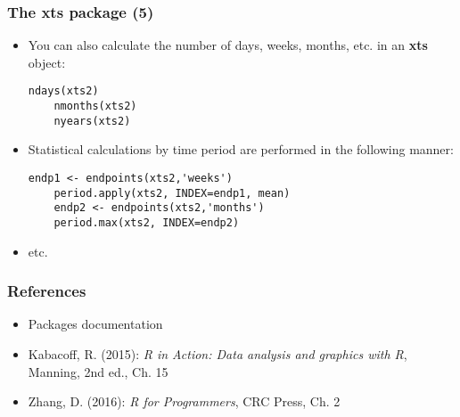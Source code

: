 \documentclass[10pt]{beamer}
\theoremstyle{definition}
\begin{document}
\begin{frame}[fragile]
\frametitle{The \textbf{xts} package (5)}
\begin{itemize}
	\item You can also calculate the number of days, weeks, months, etc. in an \textbf{xts} object:
	\begin{lstlisting}[style = rstyle, breaklines]
	ndays(xts2)
	nmonths(xts2)
	nyears(xts2)
	\end{lstlisting}
	\item Statistical calculations by time period are performed in the following manner:
	\begin{lstlisting}[style = rstyle, breaklines]
	endp1 <- endpoints(xts2,'weeks')
	period.apply(xts2, INDEX=endp1, mean)
	endp2 <- endpoints(xts2,'months')
	period.max(xts2, INDEX=endp2)
	\end{lstlisting}
	\item etc.
\end{itemize}
\end{frame}

\begin{frame}[fragile]
\frametitle{References}
\begin{itemize}
	\item Packages documentation
	\item Kabacoff, R. (2015): \textit{R in Action: Data analysis and graphics with R}, Manning, 2nd ed., Ch. 15
	\item Zhang, D. (2016): \textit{R for Programmers}, CRC Press, Ch. 2
\end{itemize}
\end{frame}
\end{document}
